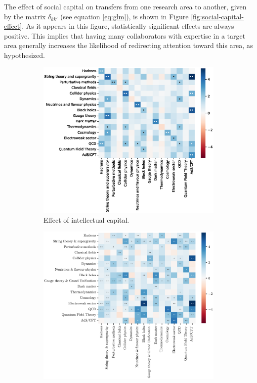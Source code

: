 \documentclass{article}
\begin{document}
The effect of social capital on transfers from one research area to another, given by the matrix $\delta_{kk'}$ (see equation \ref{eq:glm}), is shown in Figure \ref{fig:social-capital-effect}. As it appears in this figure, statistically significant effects are always positive. This implies that having many collaborators with expertise in a target area generally increases the likelihood of redirecting attention toward this area, as hypothesized. 


\begin{figure}[h]
\hspace{-2em}
\begin{subfigure}{.5\textwidth}
    \includegraphics[width=1\textwidth]{plots/ei_gamma_control.eps}
    \caption{Effect of intellectual capital.}
    \label{fig:intellectual-capital-effect}
\end{subfigure}%
\begin{subfigure}{.5\textwidth}
    \includegraphics[width=1\textwidth]{plots/ei_delta_control.eps}

\end{subfigure}
\end{figure}
\end{document}
